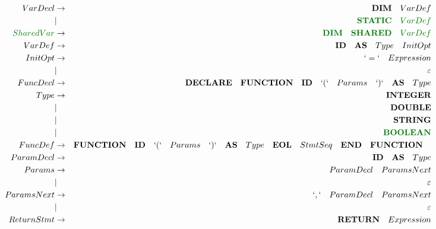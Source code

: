 \documentclass[a4paper,11pt,landscape,leqno]{article}
\begin{document}
\begin{eqnarray}
VarDecl		& \rightarrow		& \textbf{DIM}\quad VarDef \\
			&		|			& \textcolor{green1}{\textbf{STATIC}\quad VarDef} \\
\textcolor{green1}{SharedVar}&		 \rightarrow		   & \textcolor{green1}{\textbf{DIM}\quad \textbf{SHARED}\quad VarDef} \\
VarDef		& \rightarrow		& \textbf{ID}\quad \textbf{AS}\quad Type \quad InitOpt\\
InitOpt		&	   \rightarrow	& `=`\quad Expression \\
			&		|			& \varepsilon \\
FuncDecl	&  \rightarrow		& \textbf{DECLARE}\quad \textbf{FUNCTION}\quad \textbf{ID}\quad `(` \quad Params \quad`)`\quad \textbf{AS}\quad Type   \\
Type		&	 \rightarrow	&	 \textbf{INTEGER}	 \\
			&		|			& \textbf{DOUBLE}	\\
			&		|			& \textbf{STRING}	\\
			&		|			& \textcolor{green1}{\textbf{BOOLEAN}}	\\
	FuncDef    &	\rightarrow    & \textbf{FUNCTION}\quad \textbf{ID}\quad `(`\quad Params\quad `)`\quad \textbf{AS}\quad Type\quad \textbf{EOL}\quad StmtSeq\quad \textbf{END}\quad \textbf{FUNCTION}\quad \\
ParamDecl	&	\rightarrow   & {\textbf{ID}\quad \textbf{AS}\quad Type}	\\
Params		&	 \rightarrow	& {ParamDecl}\quad ParamsNext  \\
			&	 |				& \varepsilon			  \\
ParamsNext	&	 \rightarrow	& `,`\quad {ParamDecl}\quad  ParamsNext   \\
			&	 |				& \varepsilon			  \\
ReturnStmt	&	\rightarrow		& \textbf{RETURN}\quad Expression	  \\

\end{eqnarray}
\end{document}
